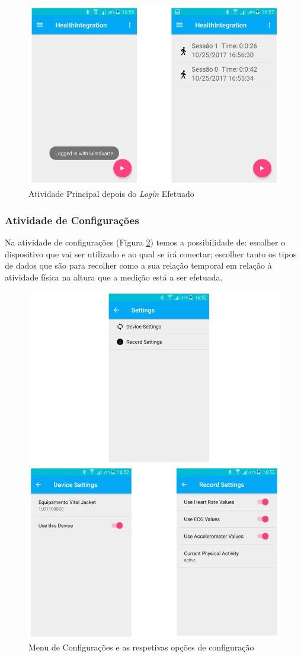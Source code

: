 \begin{figure}[H]
\centering
\includegraphics[height=0.4\textwidth]{imgs/afterlogin.png}
\caption[Atividade Principal depois do \textit{Login} Efetuado]{Atividade Principal depois do \textit{Login} Efetuado}
\label{f:afterlogin}
\end{figure}

\subsubsection{Atividade de Configurações}
Na atividade de configurações (Figura \ref{f:settings}) temos a possibilidade de: escolher o dispositivo que vai ser utilizado e ao qual se irá conectar; escolher tanto os tipos de dados que são para recolher como a sua relação temporal em relação à atividade física na altura que a medição está a ser efetuada.
\begin{figure}[H]
\centering
\includegraphics[height=0.6\textwidth]{imgs/settings.png}
\caption[Menu de Configurações e as respetivas opções de configuração]{Menu de Configurações e as respetivas opções de configuração}
\label{f:settings}
\end{figure}


